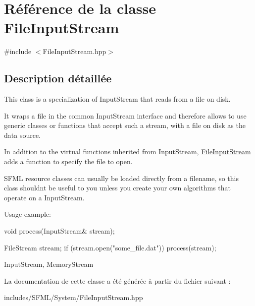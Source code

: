 \hypertarget{classFileInputStream}{}\section{Référence de la classe File\+Input\+Stream}
\label{classFileInputStream}


{\ttfamily \#include $<$File\+Input\+Stream.\+hpp$>$}



\subsection{Description détaillée}
This class is a specialization of Input\+Stream that reads from a file on disk.

It wraps a file in the common Input\+Stream interface and therefore allows to use generic classes or functions that accept such a stream, with a file on disk as the data source.

In addition to the virtual functions inherited from Input\+Stream, \hyperlink{classFileInputStream}{File\+Input\+Stream} adds a function to specify the file to open.

S\+F\+ML resource classes can usually be loaded directly from a filename, so this class shouldn\textquotesingle{}t be useful to you unless you create your own algorithms that operate on a Input\+Stream.

Usage example\+: 
\begin{DoxyCode}
\textcolor{keywordtype}{void} process(InputStream& stream);

FileStream stream;
\textcolor{keywordflow}{if} (stream.open(\textcolor{stringliteral}{"some\_file.dat"}))
   process(stream);
\end{DoxyCode}


Input\+Stream, Memory\+Stream 

La documentation de cette classe a été générée à partir du fichier suivant \+:\begin{DoxyCompactItemize}
\item 
includes/\+S\+F\+M\+L/\+System/File\+Input\+Stream.\+hpp\end{DoxyCompactItemize}
